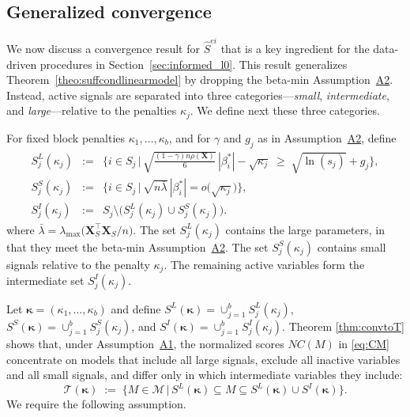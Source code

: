 \documentclass[
  12pt]{article}
\newcommand{\M}{\mathcal{M}}
\newcommand{\T}{\mathcal{T}}
\newcommand{\bX}{\mathbf{X}}
\newcommand{\bkappa}{\boldsymbol{\kappa}}
\begin{document}
\subsection{Generalized convergence}\label{ssec:nobetaminhyp}

We now discuss a convergence result for $\hat S^{ei}$ that is a key ingredient for the data-driven procedures in Section~\ref{sec:informed_l0}. This result generalizes Theorem~\ref{theo:suffcondlinearmodel} by dropping the beta-min Assumption~\hyperlink{lab:A2}{A2}. Instead, active signals are separated into three categories---\emph{small}, \emph{intermediate}, and \emph{large}---relative to the penalties $\kappa_j$. We define next these three categories.

For fixed block penalties $\kappa_1,\ldots,\kappa_b$, and for $\gamma$ and $g_j$ as in Assumption~\hyperlink{lab:A2}{A2}, define
\begin{eqnarray}\label{eq:defSes}
    S_j^{L}(\kappa_j)
    &:=&
    \Big\{ i \in S_j \,\Big|\, \sqrt{\frac{(1-\gamma) n\rho(\bX)}{6}}\,|\beta_i^*|-\sqrt{\kappa_j}
    \;\geq\;\sqrt{\ln(s_j)} + g_j\Big\},\label{eq:defslsi}\\
    S_j^{S}(\kappa_j)
    &:=&
    \Big\{ i \in S_j \,\Big|\, \sqrt{n\bar{\lambda}}\,|\beta_i^*|=o\!\big(\sqrt{\kappa_j}\big) \Big\},\nonumber\\
    S_j^{I}(\kappa_j)
    &:=&
    S_j \setminus \big(S_j^{L}(\kappa_j) \cup S_j^{S}(\kappa_j)\big).\nonumber
\end{eqnarray}
where $\bar{\lambda}=\lambda_{\max}\Big(\bX_{S}^\top\bX_{S}/n\Big)$.
The set $S_j^{L}(\kappa_j)$ contains the large parameters, in that they meet the beta-min Assumption~\hyperlink{lab:A2}{A2}. The set $S_j^{S}(\kappa_j)$ contains small signals relative to the penalty $\kappa_j$. The remaining active variables form the intermediate set $S_j^{I}(\kappa_j)$.

Let $\bkappa=(\kappa_1,\ldots,\kappa_b)$ and define
$S^{L}(\bkappa)=\cup_{j=1}^b S_j^{L}(\kappa_j)$,
$S^{S}(\bkappa)=\cup_{j=1}^b S_j^{S}(\kappa_j)$, and
$S^{I}(\bkappa)=\cup_{j=1}^b S_j^{I}(\kappa_j)$.
Theorem \ref{thm:convtoT} shows that, under Assumption~\hyperlink{lab:A1}{A1}, the normalized scores $NC(M)$ in \eqref{eq:CM} concentrate on models that include all large signals, exclude all inactive variables and all small signals, and differ only in which intermediate variables they include:
\begin{equation} \label{eq:Tkappa}
\T(\bkappa)
\;:=\;
\Big\{M \in \M \,\Big|\,
S^{L}(\bkappa)\subseteq M \subseteq S^{L}(\bkappa)\cup S^{I}(\bkappa)
\Big\}.
\end{equation}
We require the following assumption.
\end{document}
